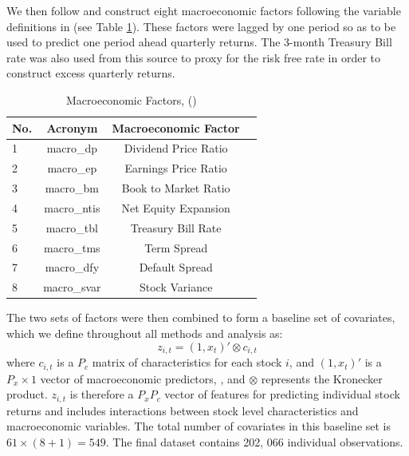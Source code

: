 \documentclass{article}
\begin{document}
We then follow \cite{gu_empirical_2019} and construct eight macroeconomic factors following the variable definitions in \cite{welch_comprehensive_2008} (see Table \ref{macro_factors}). These factors were lagged by one period so as to be used to predict one period ahead quarterly returns. The 3-month Treasury Bill rate was also used from this source to proxy for the risk free rate in order to construct excess quarterly returns. 
\begin{table}
	\caption{Macroeconomic Factors, (\cite{welch_comprehensive_2008})}
	\label{macro_factors}
	\begin{center}
		\begin{tabular}{lccc} \hline
			No. & Acronym & Macroeconomic Factor \\ \hline
			1 & macro\_dp & Dividend Price Ratio \\
			2 & macro\_ep & Earnings Price Ratio \\
			3 & macro\_bm & Book to Market Ratio \\
			4 & macro\_ntis & Net Equity Expansion \\
			5 & macro\_tbl & Treasury Bill Rate \\
			6 & macro\_tms & Term Spread \\
			7 & macro\_dfy & Default Spread \\
			8 & macro\_svar & Stock Variance \\ \hline
		\end{tabular}
	\end{center}
\end{table}
The two sets of factors were then combined to form a baseline set of covariates, which we define throughout all methods and analysis as:
\begin{equation}
z_{i,t} = (1, x_t)' \otimes c_{i, t}
\end{equation}
where $c_{i,t}$ is a $P_c$ matrix of characteristics for each stock $i$, and $(1, x_t)'$ is a $P_x \times 1$ vector of macroeconomic predictors, , and $\otimes$ represents the Kronecker product. $z_{i,t}$ is therefore a $P_x P_c$ vector of features for predicting individual stock returns and includes interactions between stock level characteristics and macroeconomic variables. The total number of covariates in this baseline set is $61 \times (8 + 1) = 549$. The final dataset contains 202, 066 individual observations. 
\end{document}
